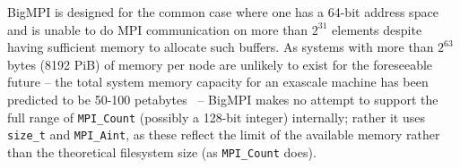 BigMPI is designed for the common case where one has a 64-bit address
space and is unable to do MPI communication on more than $2^{31}$ elements
despite having sufficient memory to allocate such buffers.
As systems with more than $2^{63}$ bytes (8192 PiB) of memory 
per node are unlikely to exist for the foreseeable future --
the total system memory capacity for an exascale machine has been 
predicted to be 50-100 petabytes~\cite{shalf2011exascale} --
BigMPI makes no attempt to support the full range of \texttt{MPI\_Count}
(possibly a 128-bit integer) internally; rather it uses \texttt{size\_t}
and \texttt{MPI\_Aint}, as these reflect the limit of the available memory
rather than the theoretical filesystem size (as \texttt{MPI\_Count} does).
